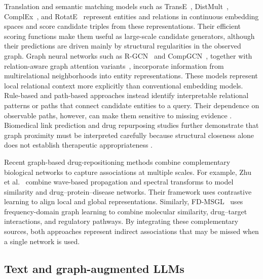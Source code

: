 \documentclass[pdflatex,sn-mathphys-num]{sn-jnl}
\begin{document}
Translation and semantic matching models such as TransE~\citep{bordes2013translating}, DistMult~\citep{yang2014embedding}, ComplEx~\citep{trouillon2016complex}, and RotatE~\citep{sunrotate} represent entities and relations in continuous embedding spaces and score candidate triples from these representations. Their efficient scoring functions make them useful as large-scale candidate generators, although their predictions are driven mainly by structural regularities in the observed graph. Graph neural networks such as R-GCN~\citep{schlichtkrull2018modeling} and CompGCN~\citep{vashishthcomposition}, together with relation-aware graph attention variants~\citep{sheikh2021knowledge}, incorporate information from multirelational neighborhoods into entity representations. These models represent local relational context more explicitly than conventional embedding models. Rule-based and path-based approaches instead identify interpretable relational patterns or paths that connect candidate entities to a query. Their dependence on observable paths, however, can make them sensitive to missing evidence \citep{yang2017differentiable,meilicke2019anytime,cheng2023neural}. Biomedical link prediction and drug repurposing studies further demonstrate that graph proximity must be interpreted carefully because structural closeness alone does not establish therapeutic appropriateness \citep{himmelstein2017systematic,sadegh2020exploring,ashburn2004drug,pushpakom2019drug}.


\begin{revisionblock}
Recent graph-based drug-repositioning methods combine complementary biological networks to capture associations at multiple scales. For example, Zhu et al.~\citep{zhu2026spatialspectral} combine wave-based propagation and spectral transforms to model similarity and drug--protein--disease networks. Their framework uses contrastive learning to align local and global representations. Similarly, FD-MSGL~\citep{zhu2026fdmsgl} uses frequency-domain graph learning to combine molecular similarity, drug--target interactions, and regulatory pathways. By integrating these complementary sources, both approaches represent indirect associations that may be missed when a single network is used.
\end{revisionblock}

\subsection{Text and graph-augmented LLMs}
\end{document}
